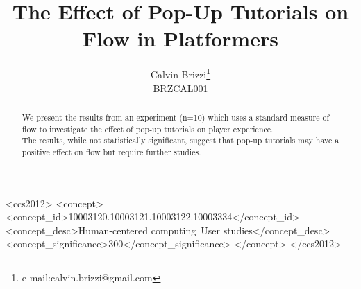 \documentclass{acmsiggraph}
\title{The Effect of Pop-Up Tutorials on Flow in Platformers}
\author{Calvin Brizzi\thanks{e-mail:calvin.brizzi@gmail.com}\\BRZCAL001}
\begin{document}


\maketitle

\begin{abstract}

We present the results from an experiment (n=10) which uses a standard measure of flow to investigate the effect of pop-up tutorials on player experience.\\
The results, while not statistically significant, suggest that pop-up tutorials may have a positive effect on flow but require further studies.

\end{abstract}

%
%
\begin{CCSXML}
<ccs2012>
<concept>
<concept_id>10003120.10003121.10003122.10003334</concept_id>
<concept_desc>Human-centered computing~User studies</concept_desc>
<concept_significance>300</concept_significance>
</concept>
</ccs2012>
\end{CCSXML}


%
%


\keywordlist

\conceptlist

\printcopyright
\end{document}
